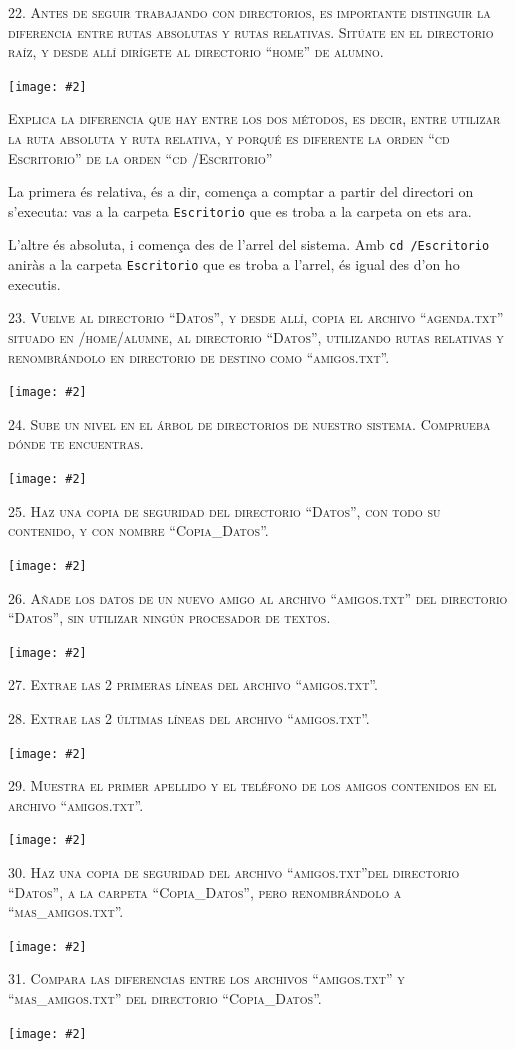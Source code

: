 \documentclass[a4paper,12pt]{article}
\newcommand{\mygraphic}[2][height=0.45\textheight]{\begin{center}
		\centering\texttt{[image: \#2]}\par
\end{center}}
\begin{document}
\newpage
\textsc{22. Antes de seguir trabajando con directorios, es importante distinguir la diferencia entre rutas absolutas y rutas relativas. Sitúate en el directorio raíz, y desde allí  dirígete al directorio “home” de alumno.}
\mygraphic{imatges/22.png}

\textsc{Explica la diferencia que hay entre los dos métodos, es decir, entre utilizar la ruta absoluta y ruta relativa, y porqué es diferente la orden “cd Escritorio” de la orden “cd /Escritorio”}

La primera és relativa, és a dir, comença a comptar a partir del directori on s'executa: vas a la carpeta \texttt{Escritorio} que es troba a la carpeta on ets ara.

L'altre és absoluta, i comença des de l'arrel del sistema. Amb \texttt{cd /Escritorio} aniràs a la carpeta \texttt{Escritorio} que es troba a l'arrel, és igual des d'on ho executis.

\newpage
\textsc{23. Vuelve al directorio “Datos”, y desde allí, copia el archivo “agenda.txt” situado en /home/alumne, al directorio “Datos”, utilizando rutas relativas y renombrándolo en directorio de destino como “amigos.txt”.}
\mygraphic{imatges/23.png}

\newpage
\textsc{24. Sube un nivel en el árbol de directorios de nuestro sistema. Comprueba dónde te encuentras.}
\mygraphic{imatges/24.png}

\newpage
\textsc{25. Haz una copia de seguridad del directorio “Datos”, con todo su contenido, y con nombre “Copia\_Datos”.}
\mygraphic{imatges/25.png}

\newpage
\textsc{26. Añade los datos de un nuevo amigo al archivo “amigos.txt” del directorio “Datos”, sin utilizar ningún procesador de textos.}
\mygraphic{imatges/26.png}

\newpage
\textsc{27. Extrae las 2 primeras líneas del archivo “amigos.txt”.}

\textsc{28. Extrae las 2 últimas líneas del archivo “amigos.txt”.}
\mygraphic{imatges/27-28.png}

\newpage
\textsc{29. Muestra el primer apellido y el teléfono de los amigos contenidos en el archivo “amigos.txt”.}
\mygraphic{imatges/29.png}

\newpage
\textsc{30. Haz una copia de seguridad del archivo “amigos.txt”del directorio “Datos”, a la carpeta “Copia\_Datos”, pero renombrándolo a “mas\_amigos.txt”.}
\mygraphic{imatges/30.png}

\newpage
\textsc{31. Compara las diferencias entre los archivos “amigos.txt” y “mas\_amigos.txt” del directorio “Copia\_Datos”.}
\mygraphic{imatges/31.png}
\end{document}

